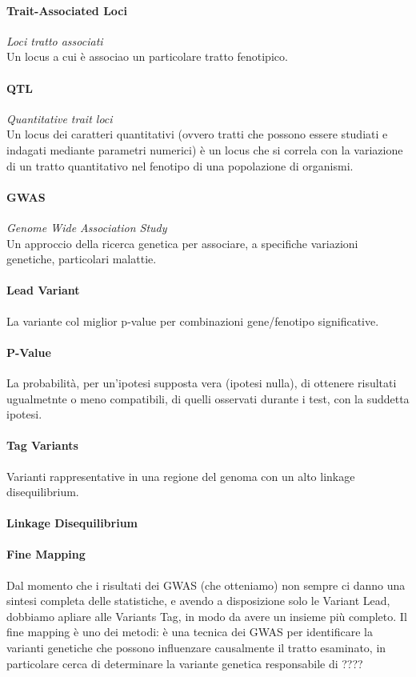 \documentclass{article}
\begin{document}
\paragraph{Trait-Associated Loci}\textit{Loci tratto associati}\\Un locus a cui è associao un particolare tratto fenotipico.
\paragraph{QTL}\textit{Quantitative trait loci}\\
    Un locus dei caratteri quantitativi (ovvero tratti che possono essere studiati e indagati mediante parametri numerici) è un locus che si correla con la variazione di un tratto quantitativo nel fenotipo di una popolazione di organismi.
\paragraph{GWAS}\textit{Genome Wide Association Study}\\Un approccio della ricerca genetica per associare, a specifiche variazioni genetiche, particolari malattie.
\paragraph{Lead Variant}La variante col miglior p-value per combinazioni gene/fenotipo significative.
\paragraph{P-Value}La probabilità, per un'ipotesi supposta vera (ipotesi nulla), di ottenere risultati ugualmetnte o meno compatibili, di quelli osservati durante i test, con la suddetta ipotesi.
\paragraph{Tag Variants}Varianti rappresentative in una regione del genoma con un alto linkage disequilibrium.
\paragraph{Linkage Disequilibrium}
\paragraph{Fine Mapping}Dal momento che i risultati dei GWAS (che otteniamo) non sempre ci danno una sintesi completa delle statistiche, e avendo a disposizione solo le Variant Lead, dobbiamo apliare alle Variants Tag, in modo da avere un insieme più completo. Il fine mapping è uno dei metodi: è una tecnica dei GWAS per identificare la varianti genetiche che possono influenzare causalmente il tratto esaminato, in particolare cerca di determinare la variante genetica responsabile di ????
\end{document}
